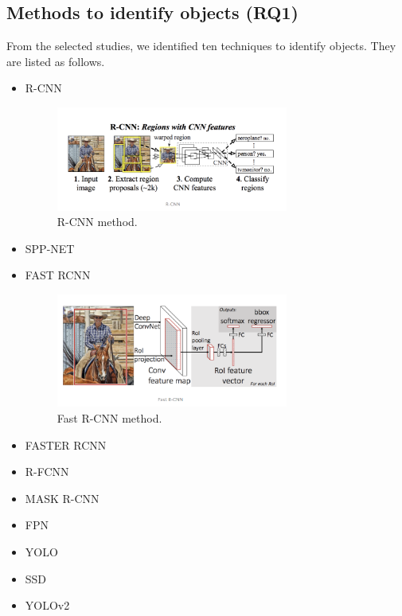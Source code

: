 \documentclass[two column]{ieeeaccess}
\begin{document}
\subsection{Methods to identify objects (RQ1)}
From the selected studies, we identified ten techniques to identify objects. They are listed as follows.
\begin{itemize}

    \item R-CNN
    
    \begin{figure}[h]
    \centering
    \includegraphics[width=3in]{q1.PNG}
    \caption{R-CNN method.}
    \label{fig12}
    \end{figure}
    
    \item SPP-NET
    
    \item FAST RCNN
    
    \begin{figure}[h]
    \centering
    \includegraphics[width=3in]{q11.PNG}
    \caption{Fast R-CNN method.}
    \label{fig13}
    \end{figure}
    
    \item FASTER RCNN
    
    \item R-FCNN
    
    \item MASK R-CNN
    
    \item FPN
    
    \item YOLO
    
    \item SSD
    
    \item YOLOv2
    
\end{itemize}
\end{document}
